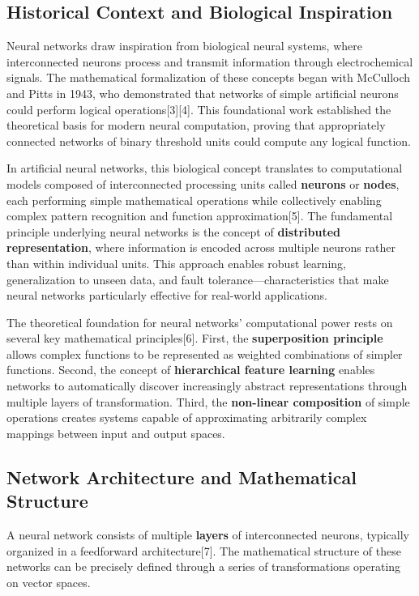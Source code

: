 \documentclass[11pt,a4paper]{report}
\begin{document}
\subsection{Historical Context and Biological Inspiration}

Neural networks draw inspiration from biological neural systems, where interconnected neurons process and transmit information through electrochemical signals. The mathematical formalization of these concepts began with McCulloch and Pitts in 1943, who demonstrated that networks of simple artificial neurons could perform logical operations[3][4]. This foundational work established the theoretical basis for modern neural computation, proving that appropriately connected networks of binary threshold units could compute any logical function.

In artificial neural networks, this biological concept translates to computational models composed of interconnected processing units called \textbf{neurons} or \textbf{nodes}, each performing simple mathematical operations while collectively enabling complex pattern recognition and function approximation[5]. The fundamental principle underlying neural networks is the concept of \textbf{distributed representation}, where information is encoded across multiple neurons rather than within individual units. This approach enables robust learning, generalization to unseen data, and fault tolerance—characteristics that make neural networks particularly effective for real-world applications.

The theoretical foundation for neural networks' computational power rests on several key mathematical principles[6]. First, the \textbf{superposition principle} allows complex functions to be represented as weighted combinations of simpler functions. Second, the concept of \textbf{hierarchical feature learning} enables networks to automatically discover increasingly abstract representations through multiple layers of transformation. Third, the \textbf{non-linear composition} of simple operations creates systems capable of approximating arbitrarily complex mappings between input and output spaces.

\subsection{Network Architecture and Mathematical Structure}

A neural network consists of multiple \textbf{layers} of interconnected neurons, typically organized in a feedforward architecture[7]. The mathematical structure of these networks can be precisely defined through a series of transformations operating on vector spaces.
\end{document}
